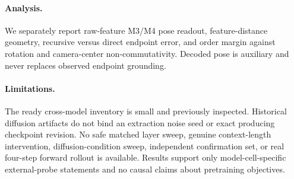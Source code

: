 \paragraph{Analysis.} We separately report raw-feature M3/M4 pose readout, feature-distance geometry, recursive versus direct endpoint error, and order margin against rotation and camera-center non-commutativity. Decoded pose is auxiliary and never replaces observed endpoint grounding.

\paragraph{Limitations.} The ready cross-model inventory is small and previously inspected. Historical diffusion artifacts do not bind an extraction noise seed or exact producing checkpoint revision. No safe matched layer sweep, genuine context-length intervention, diffusion-condition sweep, independent confirmation set, or real four-step forward rollout is available. Results support only model-cell-specific external-probe statements and no causal claims about pretraining objectives.
